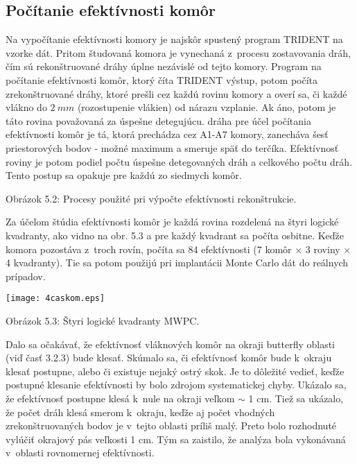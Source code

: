\subsection{Počítanie efektívnosti komôr}
Na vypočítanie efektívnosti komory je najskôr spustený program TRIDENT na
vzorke  dát. Pritom študovaná komora je vynechaná z~procesu zostavovania
dráh, čím sú rekonštruované dráhy úplne nezávislé od tejto komory. Program
na počítanie efektívnosti komôr, ktorý číta TRIDENT výstup, potom počíta
zrekonštruované  dráhy, ktoré prešli cez každú rovinu komory a
overí sa, či každé vlákno do $2\: mm$ (rozostupenie vlákien) od nárazu
vzplanie. Ak áno, potom je táto rovina považovaná za úspešne detegujúcu.
 dráha pre účel počítania efektívnosti komôr je tá, ktorá
prechádza cez A1-A7 komory, zanecháva  šesť priestorových bodov - možné
maximum a smeruje späť do terčíka. Efektívnosť roviny je potom podiel
počtu  úspešne detegovaných dráh a celkového počtu dráh. Tento postup sa
opakuje pre  každú zo siedmych komôr.

\newpage
\vspace*{3cm}
\hspace*{-0.3cm}

\vspace*{2cm}
\begin{center}
  Obrázok 5.2: Procesy použité pri výpočte efektívnosti rekonštrukcie.
\end{center}
\newpage

Za účelom štúdia efektívnosti komôr je každá rovina rozdelená na štyri
logické kvadranty, ako vidno na obr. 5.3 a pre každý kvadrant sa počíta
osbitne. Keďže komora pozostáva z~troch rovín, počíta sa 84 efektívnosti
(7 komôr $\times$ 3 roviny $\times$ 4 kvadranty). Tie sa potom
použijú pri implantácii Monte Carlo dát do reálnych prípadov.

\begin{center}
  \texttt{[image: 4caskom.eps]}
\end{center}
\begin{center}
  Obrázok 5.3: Štyri logické kvadranty MWPC.
\end{center}

Dalo sa očakávať, že efektívnosť vláknových komôr na okraji butterfly
oblasti (viď časť 3.2.3) bude klesať. Skúmalo sa, či efektívnosť komôr bude
k~okraju klesať postupne, alebo či existuje nejaký ostrý skok. Je to
dôležité vedieť, keďže postupné klesanie efektívnosti by bolo zdrojom
systematickej chyby.  Ukázalo sa, že efektívnosť postupne klesá k~nule na
okraji veľkom $\sim$ 1 cm. Tiež sa ukázalo, že počet dráh klesá smerom
k~okraju, keďže aj počet vhodných zrekonštruovaných bodov je v~tejto oblasti
príliš malý. Preto bolo rozhodnuté vylúčiť  okrajový pás veľkosti 1 cm. Tým
sa zaistilo, že analýza bola vykonávaná v~oblasti rovnomernej efektívnosti.

